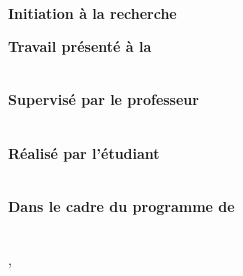 \begin{center}
\begin{spacing}{1.3}
    \textbf{\large {\UNIVERSITY}}\\
    \vspace{5mm}
\end{spacing}

\vspace{15 mm}

\begin{spacing}{1.3}
    \textbf{\LARGE {Initiation à la recherche}}\\
    \medskip
    \end{spacing}

\vspace{15 mm}


\begin{spacing}{2.0}
\textbf{\LARGE {\thesisTitle}}
\end{spacing}

\vspace{15 mm}
\end{center}

\begin{center}
    \begin{spacing}{1.3}

    \textbf{\large {Travail présenté à la}}\\
    {\large {\Faculte}}\\
    \vspace{5mm}

    \textbf{\large {Supervisé par le professeur}}\\
    {\large {\thesisTeacher}}\\
    \vspace{5mm}

    \textbf{\large {Réalisé par l’étudiant}}\\
    {\large {\thesisAuthor}}\\
    \vspace{5mm}

    \textbf{\large {Dans le cadre du programme de}}\\
    {\large {\BachelorProgramme}}\\
    
    \end{spacing}
\end{center}

\vspace{\fill}

\begin{center}
    \large {\thesisPlace, \thesisDate}
\end{center}
